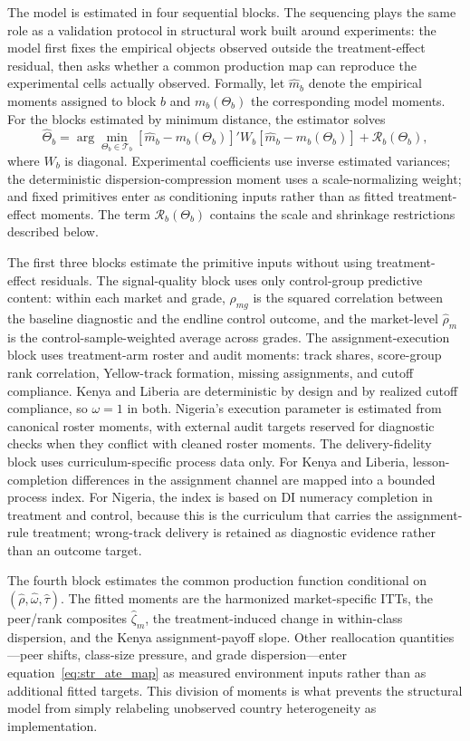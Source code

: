 \documentclass[11pt]{article}
\begin{document}
The model is estimated in four sequential blocks. The sequencing plays the same role as a validation protocol in structural work built around experiments: the model first fixes the empirical objects observed outside the treatment-effect residual, then asks whether a common production map can reproduce the experimental cells actually observed. Formally, let $\hat{m}_b$ denote the empirical moments assigned to block $b$ and $m_b(\Theta_b)$ the corresponding model moments. For the blocks estimated by minimum distance, the estimator solves
\begin{equation}
\label{eq:md_objective}
\hat{\Theta}_b
= \arg\min_{\Theta_b \in \mathcal{T}_b}
\left[\hat{m}_b - m_b(\Theta_b)\right]'
W_b
\left[\hat{m}_b - m_b(\Theta_b)\right]
+ \mathcal{R}_b(\Theta_b),
\end{equation}
where $W_b$ is diagonal. Experimental coefficients use inverse estimated variances; the deterministic dispersion-compression moment uses a scale-normalizing weight; and fixed primitives enter as conditioning inputs rather than as fitted treatment-effect moments. The term $\mathcal{R}_b(\Theta_b)$ contains the scale and shrinkage restrictions described below.

The first three blocks estimate the primitive inputs without using treatment-effect residuals. The signal-quality block uses only control-group predictive content: within each market and grade, $\rho_{mg}$ is the squared correlation between the baseline diagnostic and the endline control outcome, and the market-level $\hat{\rho}_m$ is the control-sample-weighted average across grades. The assignment-execution block uses treatment-arm roster and audit moments: track shares, score-group rank correlation, Yellow-track formation, missing assignments, and cutoff compliance. Kenya and Liberia are deterministic by design and by realized cutoff compliance, so $\omega=1$ in both. Nigeria's execution parameter is estimated from canonical roster moments, with external audit targets reserved for diagnostic checks when they conflict with cleaned roster moments. The delivery-fidelity block uses curriculum-specific process data only. For Kenya and Liberia, lesson-completion differences in the assignment channel are mapped into a bounded process index. For Nigeria, the index is based on DI numeracy completion in treatment and control, because this is the curriculum that carries the assignment-rule treatment; wrong-track delivery is retained as diagnostic evidence rather than an outcome target.

The fourth block estimates the common production function conditional on $(\hat{\rho},\hat{\omega},\hat{\tau})$. The fitted moments are the harmonized market-specific ITTs, the peer/rank composites $\hat{\zeta}_m$, the treatment-induced change in within-class dispersion, and the Kenya assignment-payoff slope. Other reallocation quantities---peer shifts, class-size pressure, and grade dispersion---enter equation~\eqref{eq:str_ate_map} as measured environment inputs rather than as additional fitted targets. This division of moments is what prevents the structural model from simply relabeling unobserved country heterogeneity as implementation.
\end{document}
